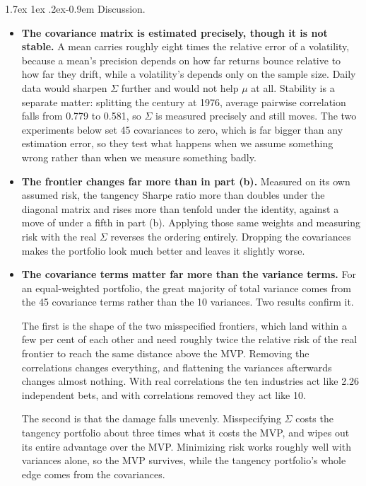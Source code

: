 \documentclass[11pt]{article}
\makeatletter
\renewcommand\paragraph{\@startsection{paragraph}{4}{0pt}%
  {1.7ex \@plus 1ex \@minus .2ex}{-0.9em}%
  {\normalfont\bfseries\normalsize\color{psink}}}
\makeatother
\begin{document}
\paragraph{Discussion.}
\begin{itemize}
\setlength{\itemsep}{4pt}\setlength{\parskip}{0pt}

\item \textbf{The covariance matrix is estimated precisely, though it is not
stable.} A mean carries roughly eight times the relative error of a
volatility, because a mean's precision depends on how far returns bounce
relative to how far they drift, while a volatility's depends only on the
sample size. Daily data would sharpen $\Sigma$ further and would not help
$\mu$ at all. Stability is a separate matter: splitting the century at 1976,
average pairwise correlation falls from 0.779 to 0.581, so $\Sigma$ is
measured precisely and still moves. The two experiments below set 45
covariances to zero, which is far bigger than any estimation error, so they
test what happens when we assume something wrong rather than when we measure
something badly.

\item \textbf{The frontier changes far more than in part (b).} Measured on its
own assumed risk, the tangency Sharpe ratio more than doubles under the
diagonal matrix and rises more than tenfold under the identity, against a move
of under a fifth in part (b). Applying those same weights and measuring risk
with the real $\Sigma$ reverses the ordering entirely. Dropping the
covariances makes the portfolio look much better and leaves it slightly worse.

\item \textbf{The covariance terms matter far more than the variance terms.}
For an equal-weighted portfolio, the great majority of total variance comes
from the 45 covariance terms rather than the 10 variances. Two results confirm
it.

The first is the shape of the two misspecified frontiers, which land within a
few per cent of each other and need roughly twice the relative risk of the
real frontier to reach the same distance above the MVP. Removing the
correlations changes everything, and flattening the variances afterwards
changes almost nothing. With real correlations the ten industries act like
2.26 independent bets, and with correlations removed they act like 10.

The second is that the damage falls unevenly. Misspecifying $\Sigma$ costs the
tangency portfolio about three times what it costs the MVP, and wipes out its
entire advantage over the MVP. Minimizing risk works roughly well with
variances alone, so the MVP survives, while the tangency portfolio's whole
edge comes from the covariances.

\end{itemize}
\end{document}
